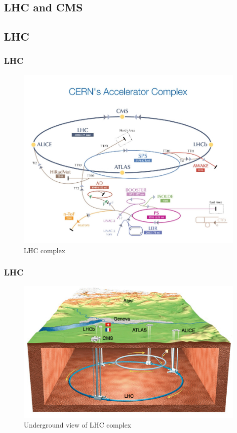 \documentclass[11pt]{beamer}
\begin{document}
\begin{frame}
\section{LHC and CMS}
\subsection{LHC}
\frametitle{LHC}
	\begin{figure}
		\centering
	\includegraphics[scale=0.2]{figures/CERN's-accelerator-complex2013.jpg}
	\caption*{LHC complex}
	\end{figure}
\end{frame}

\begin{frame}
\frametitle{LHC}
\begin{figure}
	\centering
	\includegraphics[scale=0.6]{figures/lhc-u.png}
	\caption*{Underground view of LHC complex}
\end{figure}
\end{frame}
\end{document}
